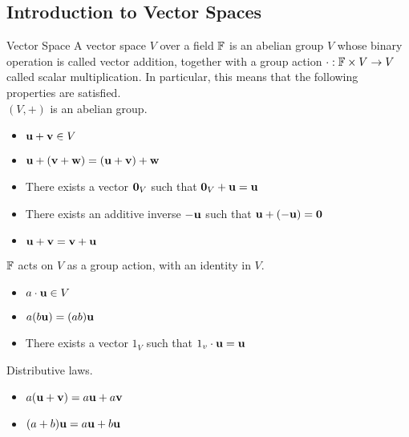 \documentclass[a4paper]{article}
\begin{document}
\subsection{Introduction to Vector Spaces}
\begin{defn}{Vector Space}{} A vector space $V$ over a field $\mathbb{F}$ is an abelian group $V$ whose binary operation is called vector addition, together with a group action $\cdot:\mathbb{F}\times V\to V$ called scalar multiplication. In particular, this means that the following properties are satisfied. \\
$(V,+)$ is an abelian group. 
\begin{itemize}
\item $\vb{u}+\vb{v}\in V$
\item $\vb{u}+(\vb{v}+\vb{w})=(\vb{u}+\vb{v})+\vb{w}$
\item There exists a vector $\vb{0}_V$ such that $\vb{0}_V+\vb{u}=\vb{u}$
\item There exists an additive inverse $-\vb{u}$ such that $\vb{u}+(-\vb{u})=\vb{0}$
\item $\vb{u}+\vb{v}=\vb{v}+\vb{u}$
\end{itemize}
$\mathbb{F}$ acts on $V$ as a group action, with an identity in $V$. 
\begin{itemize}
\item $a\cdot \vb{u}\in V$
\item $a(b\vb{u})=(ab)\vb{u}$
\item There exists a vector $1_V$ such that $1_v\cdot \vb{u}=\vb{u}$
\end{itemize}
Distributive laws. 
\begin{itemize}
\item $a(\vb{u}+\vb{v})=a\vb{u}+a\vb{v}$
\item $(a+b)\vb{u}=a\vb{u}+b\vb{u}$
\end{itemize}
\end{defn}
\end{document}
